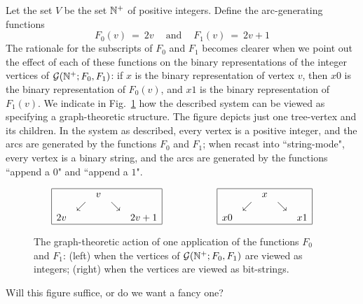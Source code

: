 Let the set $V$ be the set $\mathbb{N}^+$ of positive integers.  Define the arc-generating functions
\[
F_0(v) \ = \ 2v \ \ \ \ \mbox{ and } \ \ \ \ F_1(v) \ = \ 2v+1 \]
The rationale for the subscripts of $F_0$ and $F_1$ becomes clearer when we point out
the effect of each of these functions on the binary representations of the integer vertices of
$\mbox{$\cal G$}(\mathbb{N}^+; F_0, F_1)$: if $x$ is the binary representation of vertex $v$, then $x0$ is the 
binary representation of $F_0(v)$, and $x1$ is the binary representation of $F_1(v)$.
We indicate in Fig.~\ref{fig:one-node-tree} how the described system can be viewed
as specifying a graph-theoretic structure.  The figure depicts just one tree-vertex and its
children.  In the system as described, every vertex is a positive integer, and the arcs are
generated by the functions $F_0$ and $F_1$; when recast into ``string-mode", every vertex
is a binary string, and the arcs are generated by the functions ``append a $0$" and ``append a $1$".
\begin{figure}[hbt]
\[  \begin{array}{ccc}
\begin{array}{|ccccc|}
\hline
     &                & v &                &           \\
     & \swarrow &    & \searrow &           \\
2v &                 &   &                & 2v+1 \\
\hline
\end{array}
  & \hspace*{.5in} &
\begin{array}{|ccccc|}
\hline
     &                & x  &               &       \\ 
     & \swarrow &    & \searrow &       \\
x0 &                 &   &                & x1 \\
\hline
\end{array}
\end{array}
\]
\caption{The graph-theoretic action of one application of the functions $F_0$ and $F_1$:
(left) when the vertices of $\mbox{$\cal G$}(\mathbb{N}^+; F_0, F_1)$ are viewed as integers; (right) when the vertices
are viewed as bit-strings.}
\label{fig:one-node-tree}
\end{figure}

{\Arny Will this figure suffice, or do we want a fancy one?}

\medskip

